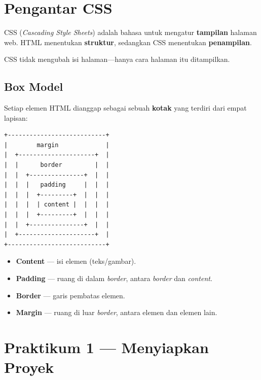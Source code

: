 \section{Pengantar CSS}
\label{sec:pengantar-css}

CSS (\emph{Cascading Style Sheets}) adalah bahasa untuk mengatur \textbf{tampilan} halaman web.
HTML menentukan \textbf{struktur}, sedangkan CSS menentukan \textbf{penampilan}.

\begin{catatan}
CSS tidak mengubah isi halaman---hanya cara halaman itu ditampilkan.
\end{catatan}

\subsection{Box Model}
\label{subsec:box-model}

Setiap elemen HTML dianggap sebagai sebuah \textbf{kotak} yang terdiri dari empat lapisan:

\begin{lstlisting}[caption={Ilustrasi box model}, label={lst:box-model-illust}]
+---------------------------+
|        margin             |
|  +---------------------+  |
|  |      border         |  |
|  |  +---------------+  |  |
|  |  |   padding     |  |  |
|  |  |  +---------+  |  |  |
|  |  |  | content |  |  |  |
|  |  |  +---------+  |  |  |
|  |  +---------------+  |  |
|  +---------------------+  |
+---------------------------+
\end{lstlisting}

\begin{itemize}
  \item \textbf{Content} --- isi elemen (teks/gambar).
  \item \textbf{Padding} --- ruang di dalam \emph{border}, antara \emph{border} dan \emph{content}.
  \item \textbf{Border} --- garis pembatas elemen.
  \item \textbf{Margin} --- ruang di luar \emph{border}, antara elemen dan elemen lain.
\end{itemize}

\section{Praktikum 1 --- Menyiapkan Proyek}
\label{sec:praktik-1}

